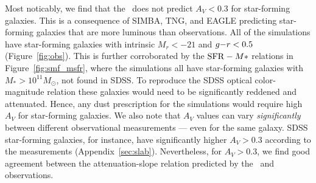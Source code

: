 Most noticably, we find that the \eda~does not predict $A_V < 0.3$ for
star-forming galaxies.
This is a consequence of SIMBA, TNG, and EAGLE predicting star-forming galaxies
that are more luminous than observations.  
All of the simulations have star-forming galaxies with intrinsic $M_r <
-21$ and $g{-}r < 0.5$ (Figure~\ref{fig:obs}). 
This is further corroborated by the ${\rm SFR}-M*$ relations in
Figure~\ref{fig:smf_msfr}, where the simulations all have star-forming
galaxies with $M_* > 10^{11}M_\odot$, not found in SDSS. 
To reproduce the SDSS optical color-magnitude relation these galaxies would
need to be significantly reddened and attenuated. 
Hence, any dust prescription for the simulations would require high 
$A_V$ for star-forming galaxies.
We also note that $A_V$ values can vary {\em significantly} between
different observational measurements --- even for the same galaxy. 
SDSS star-forming galaxies, for instance, have significantly higher 
$A_V > 0.3$ according to the \cite{brinchmann2004} measurements
(Appendix~\ref{sec:slab}).
Nevertheless, for $A_V > 0.3$, we find good agreement between the 
attenuation-slope relation predicted by the \eda~and observations. 



